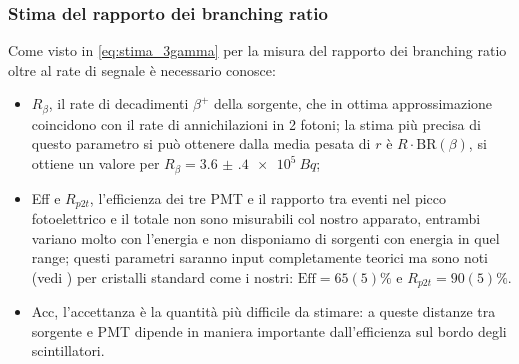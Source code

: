 \subsubsection{Stima del rapporto dei branching ratio}
Come visto in \autoref{eq:stima_3gamma} per la misura del rapporto dei branching ratio oltre al rate di segnale è necessario conosce:
\begin{itemize}
	\item $R_{\beta}$, il rate di decadimenti $\beta^+$ della sorgente, che in ottima approssimazione coincidono con il rate di annichilazioni in 2 fotoni; la stima più precisa di questo parametro si può ottenere dalla media pesata di $r$ è $R \cdot \text{BR}(\beta)$, si ottiene un valore per $R_{\beta} = \SI{3.6(4)e5}{Bq}$;
	\item Eff e $R_{p2t}$, l'efficienza dei tre PMT e il rapporto tra eventi nel picco fotoelettrico e il totale non sono misurabili col nostro apparato, entrambi variano molto con l'energia e non disponiamo di sorgenti con energia in quel range; questi parametri saranno input completamente teorici ma sono noti (vedi \cite{knoll}) per cristalli standard come i nostri: $\text{Eff} = 65(5)\%$ e $R_{p2t} = 90(5)\%$.
	\item Acc, l'accettanza è la quantità più difficile da stimare: a queste distanze tra sorgente e PMT dipende in maniera importante dall'efficienza sul bordo degli scintillatori.
\end{itemize}


